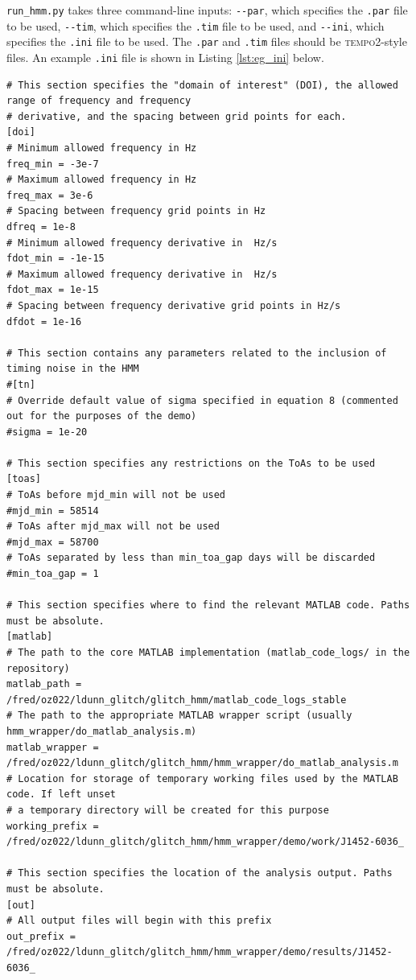 \documentclass{article}
\newcommand{\tempo}{\textsc{tempo}2}
\begin{document}
\texttt{run\_hmm.py} takes three command-line inputs: \texttt{-\/-par}, which specifies the \texttt{.par} file to be used, \texttt{-\/-tim}, which specifies the \texttt{.tim} file to be used, and \texttt{-\/-ini}, which specifies the \texttt{.ini} file to be used.
The \texttt{.par} and \texttt{.tim} files should be \tempo{}-style files.
An example \texttt{.ini} file is shown in Listing \ref{lst:eg_ini} below.
\begin{lstlisting}[caption=Example \texttt{.ini} file, label={lst:eg_ini}]
# This section specifies the "domain of interest" (DOI), the allowed range of frequency and frequency
# derivative, and the spacing between grid points for each.
[doi]
# Minimum allowed frequency in Hz
freq_min = -3e-7  
# Maximum allowed frequency in Hz
freq_max = 3e-6 
# Spacing between frequency grid points in Hz
dfreq = 1e-8  
# Minimum allowed frequency derivative in  Hz/s
fdot_min = -1e-15 
# Maximum allowed frequency derivative in  Hz/s
fdot_max = 1e-15 
# Spacing between frequency derivative grid points in Hz/s
dfdot = 1e-16

# This section contains any parameters related to the inclusion of timing noise in the HMM
#[tn]          
# Override default value of sigma specified in equation 8 (commented out for the purposes of the demo)
#sigma = 1e-20 

# This section specifies any restrictions on the ToAs to be used
[toas]
# ToAs before mjd_min will not be used
#mjd_min = 58514 
# ToAs after mjd_max will not be used
#mjd_max = 58700
# ToAs separated by less than min_toa_gap days will be discarded
#min_toa_gap = 1                                                                        

# This section specifies where to find the relevant MATLAB code. Paths must be absolute.
[matlab]                                                       
# The path to the core MATLAB implementation (matlab_code_logs/ in the repository)
matlab_path = /fred/oz022/ldunn_glitch/glitch_hmm/matlab_code_logs_stable
# The path to the appropriate MATLAB wrapper script (usually hmm_wrapper/do_matlab_analysis.m)
matlab_wrapper = /fred/oz022/ldunn_glitch/glitch_hmm/hmm_wrapper/do_matlab_analysis.m
# Location for storage of temporary working files used by the MATLAB code. If left unset
# a temporary directory will be created for this purpose
working_prefix = /fred/oz022/ldunn_glitch/glitch_hmm/hmm_wrapper/demo/work/J1452-6036_

# This section specifies the location of the analysis output. Paths must be absolute.
[out]
# All output files will begin with this prefix
out_prefix = /fred/oz022/ldunn_glitch/glitch_hmm/hmm_wrapper/demo/results/J1452-6036_    
\end{lstlisting}
\end{document}
